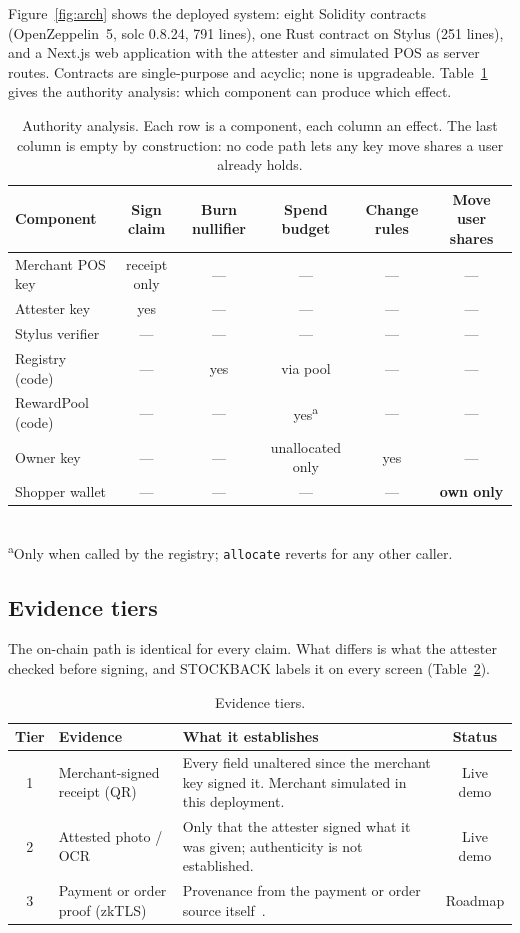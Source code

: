 \documentclass[10.5pt,letterpaper]{article}
\theoremstyle{definition}
\theoremstyle{remark}
\newcommand{\ttt}[1]{\texttt{#1}}
\begin{document}
Figure~\ref{fig:arch} shows the deployed system: eight Solidity contracts (OpenZeppelin~5, solc 0.8.24, 791 lines),
one Rust contract on Stylus (251 lines), and a Next.js web application with the attester and simulated POS as
server routes. Contracts are single-purpose and acyclic; none is upgradeable. Table~\ref{tab:authority} gives the
authority analysis: which component can produce which effect.

\begin{table}[!htb]
\centering\small
\caption{Authority analysis. Each row is a component, each column an effect. The last column is empty by
construction: no code path lets any key move shares a user already holds.}
\label{tab:authority}
\begin{tabular}{@{}lccccc@{}}
\toprule
Component & Sign claim & Burn nullifier & Spend budget & Change rules & Move user shares\\
\midrule
Merchant POS key   & receipt only & --- & --- & --- & ---\\
Attester key       & yes & --- & --- & --- & ---\\
Stylus verifier    & --- & --- & --- & --- & ---\\
Registry (code)    & --- & yes & via pool & --- & ---\\
RewardPool (code)  & --- & --- & yes\textsuperscript{a} & --- & ---\\
Owner key          & --- & --- & unallocated only & yes & ---\\
Shopper wallet     & --- & --- & --- & --- & \textbf{own only}\\
\bottomrule
\end{tabular}\\[3pt]
\footnotesize\textsuperscript{a}Only when called by the registry; \ttt{allocate} reverts for any other caller.
\end{table}

\subsection{Evidence tiers}
The on-chain path is identical for every claim. What differs is what the attester checked before signing, and
STOCKBACK labels it on every screen (Table~\ref{tab:tiers}).

\begin{table}[H]
\centering\small
\caption{Evidence tiers.}
\label{tab:tiers}
\begin{tabularx}{\textwidth}{@{}c>{\raggedright}p{3.3cm}>{\raggedright}Xc@{}}
\toprule
Tier & Evidence & What it establishes & Status\\
\midrule
1 & Merchant-signed receipt (QR) & Every field unaltered since the merchant key signed it. Merchant simulated in this deployment. & Live demo\\
2 & Attested photo / OCR & Only that the attester signed what it was given; authenticity is not established. & Live demo\\
3 & Payment or order proof (zkTLS) & Provenance from the payment or order source itself~\cite{zhang2020deco}. & Roadmap\\
\bottomrule
\end{tabularx}
\end{table}
\end{document}
